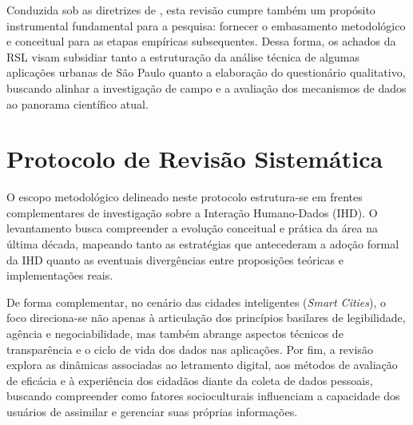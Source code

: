 \documentclass[
	12pt,				%
	oneside,			%
	a4paper,			%
	english,			%
	brazil				%
	]{abntex2ppgsi}
\begin{document}
    Conduzida sob as diretrizes de , esta revisão cumpre também um propósito instrumental fundamental para a pesquisa: fornecer o embasamento metodológico e conceitual para as etapas empíricas subsequentes. Dessa forma, os achados da RSL visam subsidiar tanto a estruturação da análise técnica de algumas aplicações urbanas de São Paulo quanto a elaboração do questionário qualitativo, buscando alinhar a investigação de campo e a avaliação dos mecanismos de dados ao panorama científico atual.



 
    \section{Protocolo de Revisão Sistemática}

    O escopo metodológico delineado neste protocolo estrutura-se em frentes complementares de investigação sobre a Interação Humano-Dados (IHD). O levantamento busca compreender a evolução conceitual e prática da área na última década, mapeando tanto as estratégias que antecederam a adoção formal da IHD quanto as eventuais divergências entre proposições teóricas e implementações reais. 

    De forma complementar, no cenário das cidades inteligentes (\textit{Smart Cities}), o foco direciona-se não apenas à articulação dos princípios basilares de legibilidade, agência e negociabilidade, mas também abrange aspectos técnicos de transparência e o ciclo de vida dos dados nas aplicações. Por fim, a revisão explora as dinâmicas associadas ao letramento digital, aos métodos de avaliação de eficácia e à experiência dos cidadãos diante da coleta de dados pessoais, buscando compreender como fatores socioculturais influenciam a capacidade dos usuários de assimilar e gerenciar suas próprias informações.
    
\end{document}
